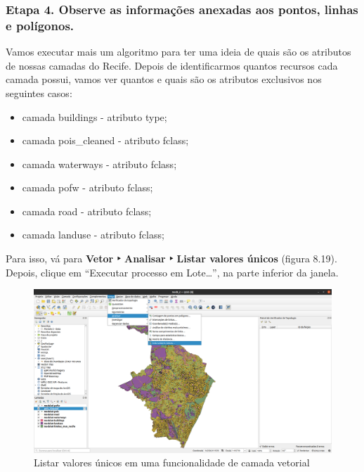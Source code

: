\documentclass[
]{book}
\providecommand{\tightlist}{%
  \setlength{\itemsep}{0pt}\setlength{\parskip}{0pt}}
\begin{document}
\hypertarget{etapa-4.-observe-as-informauxe7uxf5es-anexadas-aos-pontos-linhas-e-poluxedgonos.}{%
\subsubsection{\texorpdfstring{\textbf{Etapa 4. Observe as informações anexadas aos pontos, linhas e polígonos.}}{Etapa 4. Observe as informações anexadas aos pontos, linhas e polígonos.}}\label{etapa-4.-observe-as-informauxe7uxf5es-anexadas-aos-pontos-linhas-e-poluxedgonos.}}

Vamos executar mais um algoritmo para ter uma ideia de quais são os atributos de nossas camadas do Recife. Depois de identificarmos quantos recursos cada camada possui, vamos ver quantos e quais são os atributos exclusivos nos seguintes casos:

\begin{itemize}
\tightlist
\item
  camada buildings - atributo type;
\item
  camada pois\_cleaned - atributo fclass;
\item
  camada waterways - atributo fclass;
\item
  camada pofw - atributo fclass;
\item
  camada road - atributo fclass;
\item
  camada landuse - atributo fclass;
\end{itemize}

Para isso, vá para \textbf{Vetor ‣ Analisar ‣ Listar valores únicos} (figura 8.19). Depois, clique em ``Executar processo em Lote\ldots{}'', na parte inferior da janela.

\begin{figure}
\centering
\includegraphics{media/modulo8/fig819_a.png}
\caption{Listar valores únicos em uma funcionalidade de camada vetorial}
\end{figure}
\end{document}
